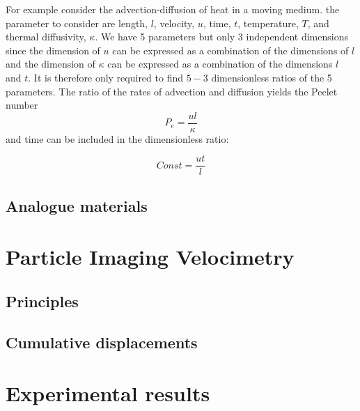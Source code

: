 \documentclass[11pt]{article}
\begin{document}
For example consider the advection-diffusion of heat in a moving medium. the parameter to consider are length, $l$, velocity, $u$, time, $t$, temperature, $T$, and thermal diffusivity, $\kappa$. We have 5 parameters but only 3 independent dimensions since the dimension of $u$ can be expressed as a combination of the dimensions of $l$ and the dimension of $\kappa$ can be expressed as a combination of the dimensions $l$ and $t$. It is therefore only required to find $5-3$ dimensionless ratios of the 5 parameters. The ratio of the rates of advection and diffusion yields the Peclet number
\begin{equation}
P_e = \frac{u l}{\kappa}
\end{equation}
and time can be included in the dimensionless ratio:

\begin{equation}
Const= \frac{u t}{l}
\end{equation}


\subsection*{Analogue materials}

\section*{Particle Imaging Velocimetry}
\subsection*{Principles}
\subsection*{Cumulative displacements}

\section*{Experimental results}
\end{document}
